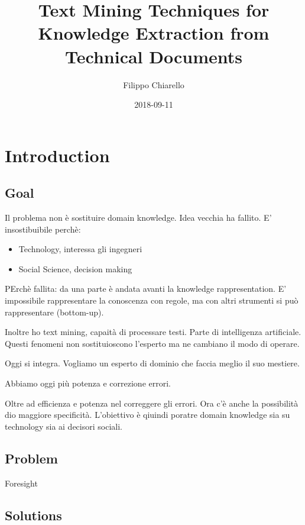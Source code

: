 \documentclass[]{book}
\title{Text Mining Techniques for Knowledge Extraction from Technical Documents}
\author{Filippo Chiarello}
\date{2018-09-11}
\providecommand{\tightlist}{%
  \setlength{\itemsep}{0pt}\setlength{\parskip}{0pt}}
\begin{document}
\maketitle

{
\setcounter{tocdepth}{1}
\tableofcontents
}
\chapter{Introduction}\label{introduction}

\section{Goal}\label{goal}

Il problema non è sostituire domain knowledge. Idea vecchia ha fallito.
E' insostibuibile perchè:

\begin{itemize}
\tightlist
\item
  Technology, interessa gli ingegneri
\item
  Social Science, decision making
\end{itemize}

PErchè fallita: da una parte è andata avanti la knowledge
rappresentation. E' impossibile rappresentare la conoscenza con regole,
ma con altri strumenti si può rappresentare (bottom-up).

Inoltre ho text mining, capaità di processare testi. Parte di
intelligenza artificiale. Questi fenomeni non sostituioscono l'esperto
ma ne cambiano il modo di operare.

Oggi si integra. Vogliamo un esperto di dominio che faccia meglio il suo
mestiere.

Abbiamo oggi più potenza e correzione errori.

Oltre ad efficienza e potenza nel correggere gli errori. Ora c'è anche
la possibilità dio maggiore specificità. L'obiettivo è qiuindi poratre
domain knowledge sia su technology sia ai decisori sociali.

\section{Problem}\label{problem}

Foresight

\section{Solutions}\label{solutions}
\end{document}
